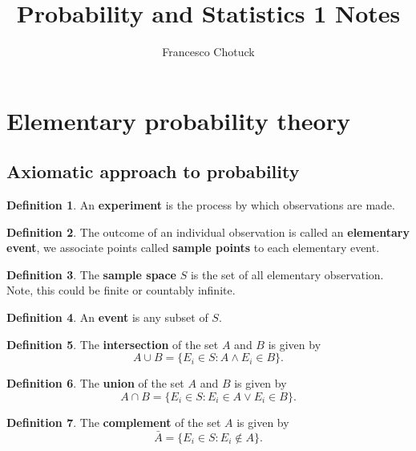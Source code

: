 \documentclass[12pt, a4paper]{article}
\title{Probability and Statistics 1 Notes}
\date{}
\author{Francesco Chotuck}
\theoremstyle{definition}
\newtheorem{definition}{Definition}[section]
\theoremstyle{plain}
\begin{document}
 
\maketitle 

\tableofcontents

\pagebreak

\section{Elementary probability theory}

\subsection{Axiomatic approach to probability}

\begin{definition}
An \textbf{experiment} is the process by which observations are made.
\end{definition}

\begin{definition}
The outcome of an individual observation is called an \textbf{elementary event}, we associate points called \textbf{sample points} to each elementary event.
\end{definition}

\begin{definition}
The \textbf{sample space} $S$ is the set of all elementary observation. Note, this could be finite or countably infinite.
\end{definition}

\begin{definition}
An \textbf{event} is any subset of $S.$
\end{definition}

\begin{definition}
The \textbf{intersection} of the set $A$ and $B$ is given by $$A\cup B = \{E_i \in S : A \wedge E_i \in B\}.$$
\end{definition}

\begin{definition}
The \textbf{union} of the set $A$ and $B$ is given by $$A \cap B = \{E_i \in S : E_i \in A \lor E_i \in B\}.$$
\end{definition}

\begin{definition}
The \textbf{complement} of the set $A$ is given by $$\bar{A} = \{E_i \in S : E_i \notin A \}.$$
\end{definition}
\end{document}
